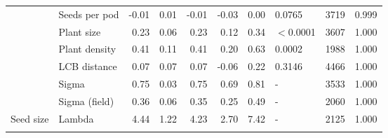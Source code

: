 \begin{longtable}{l|l|r|r|r|r|r|l|r|r}
\cline{2-10}
 & Seeds per pod & -0.01 & 0.01 & -0.01 & -0.03 & 0.00 & 0.0765 & 3719 & 0.999\\
\cline{2-10}
 & Plant size & 0.23 & 0.06 & 0.23 & 0.12 & 0.34 & $<$0.0001 & 3607 & 1.000\\
\cline{2-10}
 & Plant density & 0.41 & 0.11 & 0.41 & 0.20 & 0.63 & 0.0002 & 1988 & 1.000\\
\cline{2-10}
 & LCB distance & 0.07 & 0.07 & 0.07 & -0.06 & 0.22 & 0.3146 & 4466 & 1.000\\
\cline{2-10}
 & Sigma & 0.75 & 0.03 & 0.75 & 0.69 & 0.81 & - & 3533 & 1.000\\
\cline{2-10}
 & Sigma (field) & 0.36 & 0.06 & 0.35 & 0.25 & 0.49 & - & 2060 & 1.000\\
\cline{2-10}
\multirow{-9}{*}{\raggedright\arraybackslash Seed size} & Lambda & 4.44 & 1.22 & 4.23 & 2.70 & 7.42 & - & 2125 & 1.000\\
\hline
\label{tab:seedCoefs}
\end{longtable}
\endgroup{}
